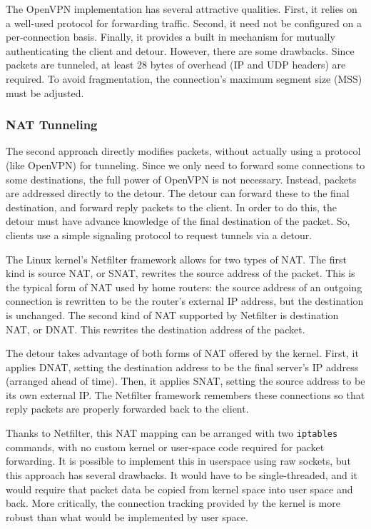 
The OpenVPN implementation has several attractive qualities. First, it relies on
a well-used protocol for forwarding traffic. Second, it need not be configured
on a per-connection basis. Finally, it provides a built in mechanism for
mutually authenticating the client and detour. However, there are some
drawbacks. Since packets are tunneled, at least 28 bytes of overhead (IP and UDP
headers) are required. To avoid fragmentation, the connection's maximum segment
size (MSS) must be adjusted.

\subsubsection{NAT Tunneling}

The second approach directly modifies packets, without actually using a protocol
(like OpenVPN) for tunneling. Since we only need to forward some connections to
some destinations, the full power of OpenVPN is not necessary. Instead, packets
are addressed directly to the detour. The detour can forward these to the
final destination, and forward reply packets to the client. In order to do this,
the detour must have advance knowledge of the final destination of the packet.
So, clients use a simple signaling protocol to request tunnels via a detour.

The Linux kernel's Netfilter framework allows for two types of NAT. The first
kind is source NAT, or SNAT, rewrites the source address of the packet. This is
the typical form of NAT used by home routers: the source address of an outgoing
connection is rewritten to be the router's external IP address, but the
destination is unchanged. The second kind of NAT supported by Netfilter is
destination NAT, or DNAT. This rewrites the destination address of the packet.


The detour takes advantage of both forms of NAT offered by the kernel. First, it
applies DNAT, setting the destination address to be the final server's IP
address (arranged ahead of time). Then, it applies SNAT, setting the source
address to be its own external IP. The Netfilter framework remembers these
connections so that reply packets are properly forwarded back to the client.

Thanks to Netfilter, this NAT mapping can be arranged with two \texttt{iptables}
commands, with no custom kernel or user-space code required for packet
forwarding. It is possible to implement this in userspace using raw sockets, but
this approach has several drawbacks. It would have to be single-threaded, and it
would require that packet data be copied from kernel space into user space and
back. More critically, the connection tracking provided by the kernel is more
robust than what would be implemented by user space.

